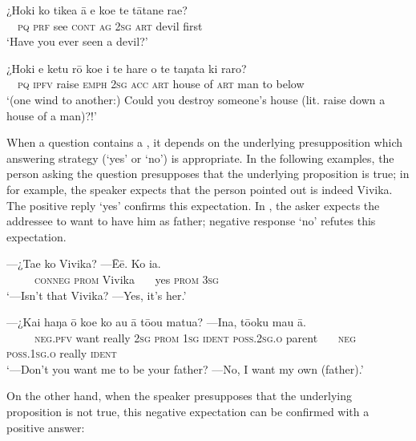 \ea\label{ex:10.23}
\gll ¿Hoki ko tike{\ꞌ}a {\ꞌ}ā e koe te tātane ra{\ꞌ}e? \\
~~\textsc{pq} \textsc{prf} see \textsc{cont} \textsc{ag} \textsc{2sg} \textsc{art} devil first \\

\glt 
‘Have you ever seen a devil?’ \textstyleExampleref{[R215.029]} 
\z

\ea\label{ex:10.24}
\gll ¿Hoki e ketu rō koe i te hare o te taŋata ki raro? \\
~~\textsc{pq} \textsc{ipfv} raise \textsc{emph} \textsc{2sg} \textsc{acc} \textsc{art} house of \textsc{art} man to below \\

\glt 
‘(one wind to another:) Could you destroy someone’s house (lit. raise down a house of a man)?!’ \textstyleExampleref{[R314.121]}\textstyleExampleref{} 
\z

When a question contains a , it depends on the underlying presupposition which answering strategy (‘yes’ or ‘no’) is appropriate. In the following examples, the person asking the question presupposes that the underlying proposition is true; in  for example, the speaker expects that the person pointed out is indeed Vivika. The positive reply ‘yes’ confirms this expectation. In , the asker expects the addressee to want to have him as father; negative response ‘no’ refutes this expectation.

\ea\label{ex:10.25}
\gll —¿Ta{\ꞌ}e ko Vivika? —{\ꞌ}Ēē. Ko ia. \\
~~~~~\textsc{conneg} \textsc{prom} Vivika ~~~yes \textsc{prom} \textsc{3sg} \\

\glt 
‘—Isn’t that Vivika? —Yes, it’s her.’ \textstyleExampleref{[R415.947]} 
\z

\ea\label{ex:10.26}
\gll —¿Kai haŋa {\ꞌ}ō koe ko au {\ꞌ}ā tō{\ꞌ}ou matu{\ꞌ}a?  —{\ꞌ}Ina, tō{\ꞌ}oku mau {\ꞌ}ā.\\
~~~~~\textsc{neg.pfv} want really \textsc{2sg} \textsc{prom} \textsc{1sg} \textsc{ident} \textsc{poss.2sg.o} parent   ~~~\textsc{neg}~ \textsc{poss.1sg.o} really \textsc{ident}\\

\glt
‘—Don’t you want me to be your father? —No, I want my own (father).’ \textstyleExampleref{[Mtx-7-26.036–037]}
\z

On the other hand, when the speaker presupposes that the underlying proposition is not true, this negative expectation can be confirmed with a positive answer:

